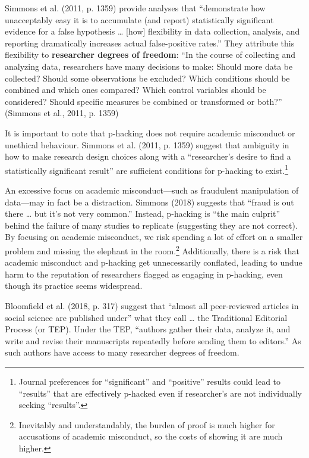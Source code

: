 \documentclass[
  letterpaper,
  DIV=11,
  numbers=noendperiod]{scrartcl}
\begin{document}
Simmons et al. (2011, p. 1359) provide analyses that ``demonstrate how
unacceptably easy it is to accumulate (and report) statistically
significant evidence for a false hypothesis \ldots{} {[}how{]}
flexibility in data collection, analysis, and reporting dramatically
increases actual false-positive rates.'' They attribute this flexibility
to \textbf{researcher degrees of freedom}: ``In the course of collecting
and analyzing data, researchers have many decisions to make: Should more
data be collected? Should some observations be excluded? Which
conditions should be combined and which ones compared? Which control
variables should be considered? Should specific measures be combined or
transformed or both?'' (Simmons et al., 2011, p. 1359)

It is important to note that p-hacking does not require academic
misconduct or unethical behaviour. Simmons et al. (2011, p. 1359)
suggest that ambiguity in how to make research design choices along with
a ``researcher's desire to find a statistically significant result'' are
sufficient conditions for p-hacking to exist.\footnote{Journal
  preferences for ``significant'' and ``positive'' results could lead to
  ``results'' that are effectively p-hacked even if researcher's are not
  individually seeking ``results''.}

An excessive focus on academic misconduct---such as fraudulent
manipulation of data---may in fact be a distraction. Simmons (2018)
suggests that ``fraud is out there \ldots{} but it's not very common.''
Instead, p-hacking is ``the main culprit'' behind the failure of many
studies to replicate (suggesting they are not correct). By focusing on
academic misconduct, we risk spending a lot of effort on a smaller
problem and missing the elephant in the room.\footnote{Inevitably and
  understandably, the burden of proof is much higher for accusations of
  academic misconduct, so the costs of showing it are much higher.}
Additionally, there is a risk that academic misconduct and p-hacking get
unnecessarily conflated, leading to undue harm to the reputation of
researchers flagged as engaging in p-hacking, even though its practice
seems widespread.

Bloomfield et al. (2018, p. 317) suggest that ``almost all peer-reviewed
articles in social science are published under'' what they call \ldots{}
the Traditional Editorial Process (or TEP). Under the TEP, ``authors
gather their data, analyze it, and write and revise their manuscripts
repeatedly before sending them to editors.'' As such authors have access
to many researcher degrees of freedom.
\end{document}
